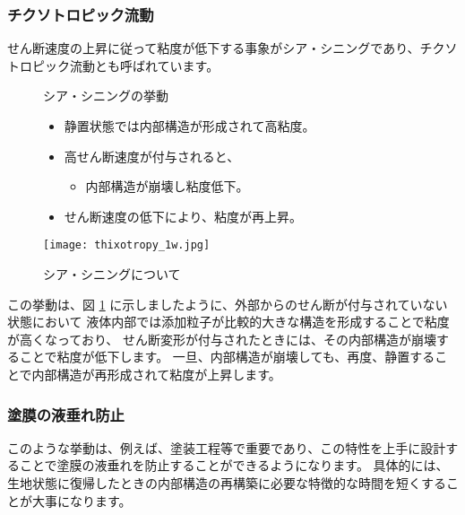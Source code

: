 \documentclass[uplatex,dvipdfmx,a4paper,11pt]{jsreport}
\begin{document}
\subsubsection{チクソトロピック流動}
せん断速度の上昇に従って粘度が低下する事象がシア・シニングであり、チクソトロピック流動とも呼ばれています。
\begin{figure}[htb]
	\begin{center}
		\begin{minipage}{0.45\textwidth}
			\begin{itembox}[l]{シア・シニングの挙動}
				\begin{itemize}
					\item 静置状態では内部構造が形成されて高粘度。
					\item 高せん断速度が付与されると、
					\begin{itemize}
						\item 内部構造が崩壊し粘度低下。
					\end{itemize}
					\item せん断速度の低下により、粘度が再上昇。
				\end{itemize}
			\end{itembox}
		\end{minipage}
		\begin{minipage}{0.45\textwidth}
			\begin{center}
			\texttt{[image: thixotropy\_1w.jpg]}
			\end{center}
		\end{minipage}
		\caption{シア・シニングについて}
		\label{fig:shear_thinning}
	\end{center}
\end{figure}
この挙動は、図 \ref{fig:shear_thinning} に示しましたように、外部からのせん断が付与されていない状態において
液体内部では添加粒子が比較的大きな構造を形成することで粘度が高くなっており、
せん断変形が付与されたときには、その内部構造が崩壊することで粘度が低下します。
一旦、内部構造が崩壊しても、再度、静置することで内部構造が再形成されて粘度が上昇します。

\subsubsection{塗膜の液垂れ防止}
このような挙動は、例えば、塗装工程等で重要であり、この特性を上手に設計することで塗膜の液垂れを防止することができるようになります。
具体的には、生地状態に復帰したときの内部構造の再構築に必要な特徴的な時間を短くすることが大事になります。
\end{document}
